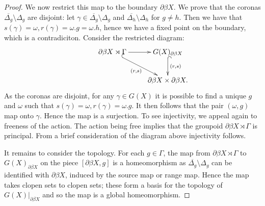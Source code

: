 \documentclass[11pt]{amsart}
\theoremstyle{plain}
\theoremstyle{definition}%
\theoremstyle{remark}%
\begin{document}
\begin{proof}
We now restrict this map to the boundary $\partial\beta X$. We prove that the coronas $\overline{\Delta_{g}}\setminus \Delta_{g}$ are disjoint: let $\gamma \in \overline{\Delta_{g}}\setminus \Delta_{g}$ and $\overline{\Delta_{h}}\setminus \Delta_{h}$ for $g \not = h$. Then we have that $s(\gamma)=\omega, r(\gamma)=\omega.g=\omega.h$, hence we have a fixed point on the boundary, which is a contradiciton. Consider the restricted diagram:
\begin{equation*}
\xymatrix{
& \partial\beta X \rtimes \Gamma \ar@{^{(}->}[rd]_{(r,s)} \ar[r] & G(X)_{\partial\beta X} \ar@{^{(}->}[d]^{(r,s)}\\ & & \partial\beta X \times \partial\beta X.
}
\end{equation*}
As the coronas are disjoint, for any $\gamma \in G(X)$ it is possible to find a unique $g$ and $\omega$ such that $s(\gamma)=\omega, r(\gamma)=\omega.g$. It then follows that the pair $(\omega,g)$ map onto $\gamma$. Hence the map is a surjection. To see injectivity, we appeal again to freeness of the action. The action being free implies that the groupoid $\partial\beta X \rtimes \Gamma$ is principal. From a brief consideration of the diagram above injectivity follows.

It remains to consider the topology. For each $g\in \Gamma$, the map from $\partial \beta X \rtimes \Gamma$ to $G(X)_{\partial\beta X}$ on the piece $[\partial\beta X,g]$ is a homeomorphism as $\overline{\Delta_{g}}\setminus\Delta_{g}$ can be identified with $\partial\beta X$, induced by the source map or range map. Hence the map takes clopen sets to clopen sets; these form a basis for the topology of $G(X)|_{\partial\beta X}$ and so the map is a global homeomorphism.
\end{proof}
\end{document}
